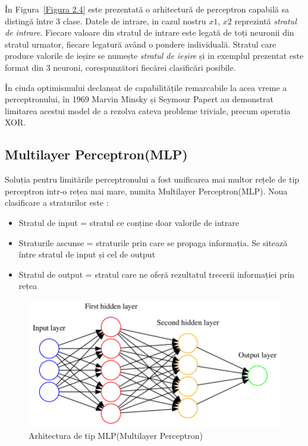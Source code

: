 În Figura~\ref{Figura 2.4} este prezentată o arhitectură de perceptron capabilă sa distingă între 3 clase. Datele de intrare, in cazul nostru $x1$, $x2$ reprezintă \textit{stratul de intrare}. Fiecare valoare din stratul de intrare este legată de toți neuronii din stratul urmator, fiecare legatură având o pondere individuală. Stratul care produce valorile de ieșire se numește \textit{stratul de ieșire} și in exemplul prezentat este format din 3 neuroni, corespunzători fiecărei clasificări posibile. 

În ciuda optimismului declanșat de capabilitățile remarcabile la acea vreme a perceptronului, în 1969 Marvin Minsky și Seymour Papert \cite{minsky1969introduction} au demonstrat limitarea acestui model de a rezolva cateva probleme triviale, precum operația XOR. 

\subsection{Multilayer Perceptron(MLP)}

Soluția pentru limitările perceptronului a fost unificarea mai multor rețele de tip perceptron intr-o rețea mai mare, numita Multilayer Perceptron(MLP). Noua clasificare a straturilor este :

\begin{itemize}
    \item Stratul de input = stratul ce conține doar valorile de intrare
    \item Straturile ascunse = straturile prin care se propaga informația. Se sitează între stratul de input și cel de output
    \item Stratul de output = stratul care ne oferă rezultatul trecerii informației prin rețea
\end{itemize}


\begin{figure}[h]
         \centering 
         \includegraphics[width=.6\linewidth]{images/MLP.png}
         \captionsetup{font=footnotesize}
         \caption{Arhitectura de tip MLP(Multilayer Perceptron) \cite{phdthesis}}
\end{figure}
    
